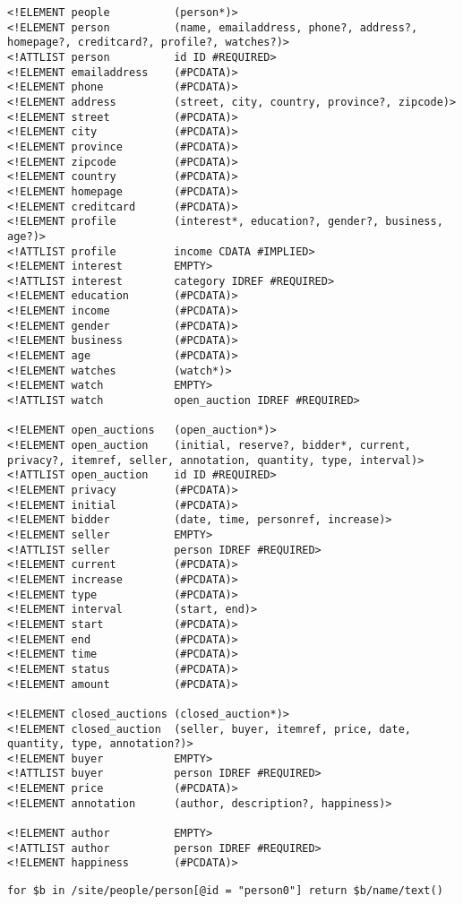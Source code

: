\begin{lstlisting}[caption=DTD of the test XML data, frame=single, label=listing_dtd]
<!ELEMENT people          (person*)>
<!ELEMENT person          (name, emailaddress, phone?, address?, homepage?, creditcard?, profile?, watches?)>
<!ATTLIST person          id ID #REQUIRED>
<!ELEMENT emailaddress    (#PCDATA)>
<!ELEMENT phone           (#PCDATA)>
<!ELEMENT address         (street, city, country, province?, zipcode)>
<!ELEMENT street          (#PCDATA)>
<!ELEMENT city            (#PCDATA)>
<!ELEMENT province        (#PCDATA)>
<!ELEMENT zipcode         (#PCDATA)>
<!ELEMENT country         (#PCDATA)>
<!ELEMENT homepage        (#PCDATA)>
<!ELEMENT creditcard      (#PCDATA)>
<!ELEMENT profile         (interest*, education?, gender?, business, age?)>
<!ATTLIST profile         income CDATA #IMPLIED>
<!ELEMENT interest        EMPTY>
<!ATTLIST interest        category IDREF #REQUIRED>
<!ELEMENT education       (#PCDATA)>
<!ELEMENT income          (#PCDATA)>
<!ELEMENT gender          (#PCDATA)>
<!ELEMENT business        (#PCDATA)>
<!ELEMENT age             (#PCDATA)>
<!ELEMENT watches         (watch*)>
<!ELEMENT watch           EMPTY>
<!ATTLIST watch           open_auction IDREF #REQUIRED>

<!ELEMENT open_auctions   (open_auction*)>
<!ELEMENT open_auction    (initial, reserve?, bidder*, current, privacy?, itemref, seller, annotation, quantity, type, interval)>
<!ATTLIST open_auction    id ID #REQUIRED>
<!ELEMENT privacy         (#PCDATA)>
<!ELEMENT initial         (#PCDATA)>
<!ELEMENT bidder          (date, time, personref, increase)>
<!ELEMENT seller          EMPTY>
<!ATTLIST seller          person IDREF #REQUIRED>
<!ELEMENT current         (#PCDATA)>
<!ELEMENT increase        (#PCDATA)>
<!ELEMENT type            (#PCDATA)>
<!ELEMENT interval        (start, end)>
<!ELEMENT start           (#PCDATA)>
<!ELEMENT end             (#PCDATA)>
<!ELEMENT time            (#PCDATA)>
<!ELEMENT status          (#PCDATA)>
<!ELEMENT amount          (#PCDATA)>

<!ELEMENT closed_auctions (closed_auction*)>
<!ELEMENT closed_auction  (seller, buyer, itemref, price, date, quantity, type, annotation?)>
<!ELEMENT buyer           EMPTY>
<!ATTLIST buyer           person IDREF #REQUIRED>
<!ELEMENT price           (#PCDATA)>
<!ELEMENT annotation      (author, description?, happiness)>

<!ELEMENT author          EMPTY>
<!ATTLIST author          person IDREF #REQUIRED>
<!ELEMENT happiness       (#PCDATA)>
\end{lstlisting}

\begin{lstlisting}[caption=Test query 1., frame=single, label=listing_test_query_1]
for $b in /site/people/person[@id = "person0"] return $b/name/text()
\end{lstlisting}

